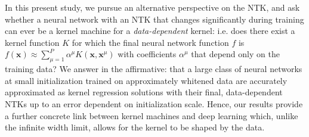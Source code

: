\documentclass{article} %
\def\x{\bm x}
\begin{document}
In this present study, we pursue an alternative perspective on the NTK, and ask whether a neural network with an NTK that changes significantly during training can ever be a kernel machine for a {\it data-dependent} kernel: i.e. does there exist a kernel function $K$ for which the final neural network function $f$ is $f(\x) \approx \sum_{\mu=1}^P \alpha^\mu K(\x,\x^\mu)$ with coefficients $\alpha^\mu$ that depend only on the training data? We answer in the affirmative: that a large class of neural networks at small initialization trained on approximately whitened data are accurately approximated as kernel regression solutions with their final, data-dependent NTKs up to an error dependent on initialization scale. %
Hence, our results provide a further concrete link between kernel machines and deep learning which, unlike the infinite width limit, allows for the kernel to be shaped by the data. 
\end{document}
